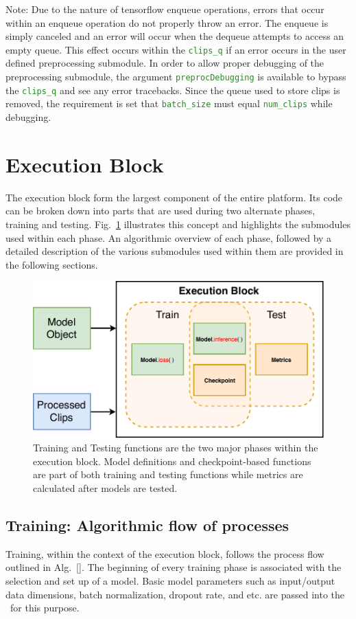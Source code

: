 \documentclass{llncs}
\begin{document}
Note: Due to the nature of tensorflow enqueue operations, errors that occur within an enqueue operation do not properly throw an error.
The enqueue is simply canceled and an error will occur when the dequeue attempts to access an empty queue.
This effect occurs within the \texttt{\textcolor{ForestGreen}{clips\_q}} if an error occurs in the user defined preprocessing submodule.
In order to allow proper debugging of the preprocessing submodule, the argument \texttt{\textcolor{ForestGreen}{preprocDebugging}} is available to bypass the \texttt{\textcolor{ForestGreen}{clips\_q}} and see any error tracebacks.
Since the queue used to store clips is removed, the requirement is set that \texttt{\textcolor{ForestGreen}{batch\_size}} must equal \texttt{\textcolor{ForestGreen}{num\_clips}} while debugging.


\section{Execution Block}
\label{sec:execblock}
The execution block form the largest component of the entire platform. Its code can be broken down into parts that are used during two alternate phases, training and testing.
Fig.~\ref{fig:exec_block} illustrates this concept and highlights the submodules used within each phase.
An algorithmic overview of each phase, followed by a detailed description of the various submodules used within them are provided in the following sections.

\begin{figure}[t!]
\centering
\includegraphics[width=0.8\columnwidth]{images/exec_block.pdf}
\caption{Training and Testing functions are the two major phases within the execution block. Model definitions and checkpoint-based functions are part of both training and testing functions while metrics are calculated after models are tested.}
\label{fig:exec_block}
\end{figure}

\subsection{Training: Algorithmic flow of processes}
\label{sec:training}
Training, within the context of the execution block, follows the process flow outlined in Alg.~\ref{}.
The beginning of every training phase is associated with the selection and set up of a model.
Basic model parameters such as input/output data dimensions, batch normalization, dropout rate, and etc. are passed into the \model~for this purpose.
\end{document}
